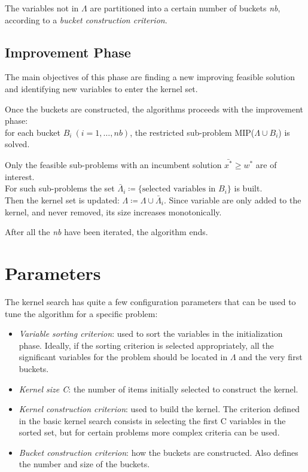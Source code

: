 The variables not in \(\Lambda\) are partitioned into a certain number of buckets \textit{nb}, according
to a \textit{bucket construction criterion}.

\subsection{Improvement Phase}
The main objectives of this phase are finding a new improving feasible solution and identifying new variables
to enter the kernel set.

Once the buckets are constructed, the algorithms proceeds with the improvement phase:\\
for each bucket \(B_{i} \ (i=1,\dots,nb)\),
the restricted sub-problem MIP(\(\Lambda \cup B_{i}\)) is solved.

Only the feasible sub-problems with an incumbent solution \(\bar{x^{*}} \geq w^{*}\) are of interest.\\
For such sub-problems the set \(\bar{\Lambda}_{i} \coloneqq \{\text{selected variables in } B_{i}\}\) is built.\\
Then the kernel set is updated: \(\Lambda \coloneqq \Lambda \cup \bar{\Lambda}_{i}\).
Since variable are only added to the kernel, and never removed, its size increases monotonically.

After all the \textit{nb} have been iterated, the algorithm ends.


\section{Parameters}
The kernel search has quite a few configuration parameters that can be used to tune the algorithm for a specific
problem:
\begin{itemize}
    \item \textit{Variable sorting criterion}: used to sort the variables in the initialization phase.
    Ideally, if the sorting criterion is selected appropriately,
    all the significant variables for the problem should be located in \(\Lambda\) and the very first buckets.
    \item \textit{Kernel size C}: the number of items initially selected to construct the kernel.
    \item \textit{Kernel construction criterion}: used to build the kernel.
    The criterion defined in the basic kernel search consists in selecting
    the first C variables in the sorted set, but for certain problems more complex criteria can be used.
    \item \textit{Bucket construction criterion}: how the buckets are constructed.
    Also defines the number and size of the buckets.
\end{itemize}


